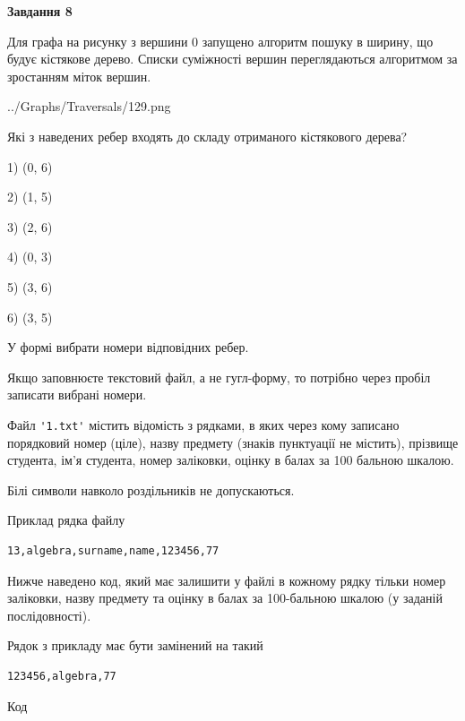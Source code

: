 \documentclass[12pt, ukrainian]{article}
\def\code#1{\Verb!#1!}
\begin{document}
{\begin {large}
{\begin {center}\textbf{Завдання 8}\end {center}}\par
Для графа на рисунку з вершини 0 запущено алгоритм пошуку в ширину, що будує кістякове дерево. Списки суміжності вершин переглядаються алгоритмом за зростанням міток вершин.\par
\begin{center}
	{../Graphs/Traversals/129.png}
\end{center}
\par Які з наведених ребер входять до складу отриманого кістякового дерева?\par
1) (0, 6)\par
2) (1, 5)\par
3) (2, 6)\par
4) (0, 3)\par
5) (3, 6)\par
6) (3, 5)\par
{\vskip 15pt} У формі вибрати номери відповідних ребер.


Якщо заповнюєте текстовий файл, а не гугл-форму, то потрібно через пробіл записа\-ти вибрані номери.\par
\newpage


Файл \code{'1.txt'} містить відомість з рядками, в яких через кому записа\-но поряд\-ковий номер (ціле), назву предмету (знаків пунктуації не містить), прізвище студента, ім'я студента, номер заліковки, оцінку в балах за 100 бальною шкалою.

Білі символи навколо роздільників не допускаються.

Приклад рядка файлу



\begin{verbatim}
13,algebra,surname,name,123456,77
\end{verbatim}


Нижче наведено код, який має залишити у файлі в кожному рядку тільки номер заліковки, назву предмету та оцінку в балах за 100-бальною шкалою (у заданій послі\-дов\-ності).

Рядок з прикладу має бути замінений на такий



\begin{verbatim}
123456,algebra,77
\end{verbatim}




Код




\end{large}}
\end{document}
